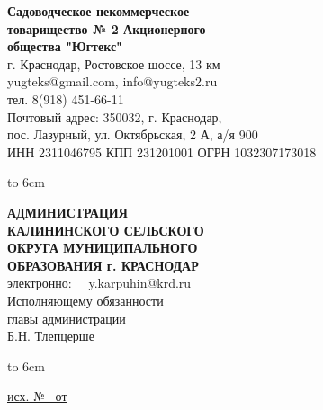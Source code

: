 \noindent\parbox[l][71mm]{80mm}
{
	 \begin{center}
 {\small \textbf{Садоводческое некоммерческое\\ товарищество
 	№  2 Акционерного\\ общества "Югтекс"\\
 }}
 \footnotesize{г. Краснодар, Ростовское шоссе, 13 км\\
 	yugteks@gmail.com, info@yugteks2.ru\\
 	тел. 8(918) 451-66-11\\
 	Почтовый адрес: 350032, г. Краснодар,\\ пос. Лазурный, ул. Октябрьская, 2 А, а/я   900
  }\\
 {ИНН 2311046795 КПП 231201001 ОГРН 1032307173018}
		\end{center}
\hbox to 6cm{ }}\hfill
\parbox[l][71mm]{65mm}
{ \begin{center}
  {\small \textbf{АДМИНИСТРАЦИЯ\\ КАЛИНИНСКОГО
 		СЕЛЬСКОГО\\ ОКРУГА МУНИЦИПАЛЬНОГО\\
 		ОБРАЗОВАНИЯ г. КРАСНОДАР\\
 }}
 \vspace{2mm}
 \footnotesize{электронно: \,\,\,\, y.karpuhin@krd.ru\\
 \vspace{2mm}
 {\normalsize  	 Исполняющему обязанности\\
 	главы администрации\\}
 	 \vspace{6mm}
 	 {\normalsize 	Б.Н. Тлепцерше}
 }\\
 \end{center}
\hbox to 6cm{ }}
\linebreak
\vspace{-10mm}

\underline{исх. №  \ от } 